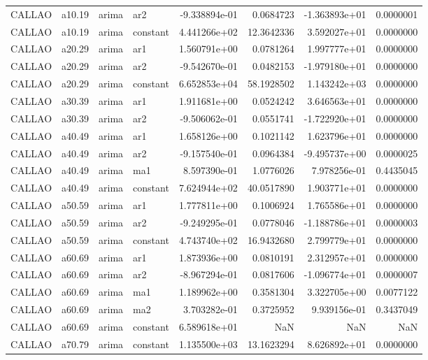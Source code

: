 \documentclass[
]{article}
\begin{document}
\begin{table}[!h]
\begin{tabular}[t]{llllrrrr}
CALLAO & a10.19 & arima & ar2 & -9.338894e-01 & 0.0684723 & -1.363893e+01 & 0.0000001\\
CALLAO & a10.19 & arima & constant & 4.441266e+02 & 12.3642336 & 3.592027e+01 & 0.0000000\\
CALLAO & a20.29 & arima & ar1 & 1.560791e+00 & 0.0781264 & 1.997777e+01 & 0.0000000\\
CALLAO & a20.29 & arima & ar2 & -9.542670e-01 & 0.0482153 & -1.979180e+01 & 0.0000000\\
\addlinespace
CALLAO & a20.29 & arima & constant & 6.652853e+04 & 58.1928502 & 1.143242e+03 & 0.0000000\\
CALLAO & a30.39 & arima & ar1 & 1.911681e+00 & 0.0524242 & 3.646563e+01 & 0.0000000\\
CALLAO & a30.39 & arima & ar2 & -9.506062e-01 & 0.0551741 & -1.722920e+01 & 0.0000000\\
CALLAO & a40.49 & arima & ar1 & 1.658126e+00 & 0.1021142 & 1.623796e+01 & 0.0000000\\
CALLAO & a40.49 & arima & ar2 & -9.157540e-01 & 0.0964384 & -9.495737e+00 & 0.0000025\\
\addlinespace
CALLAO & a40.49 & arima & ma1 & 8.597390e-01 & 1.0776026 & 7.978256e-01 & 0.4435045\\
CALLAO & a40.49 & arima & constant & 7.624944e+02 & 40.0517890 & 1.903771e+01 & 0.0000000\\
CALLAO & a50.59 & arima & ar1 & 1.777811e+00 & 0.1006924 & 1.765586e+01 & 0.0000000\\
CALLAO & a50.59 & arima & ar2 & -9.249295e-01 & 0.0778046 & -1.188786e+01 & 0.0000003\\
CALLAO & a50.59 & arima & constant & 4.743740e+02 & 16.9432680 & 2.799779e+01 & 0.0000000\\
\addlinespace
CALLAO & a60.69 & arima & ar1 & 1.873936e+00 & 0.0810191 & 2.312957e+01 & 0.0000000\\
CALLAO & a60.69 & arima & ar2 & -8.967294e-01 & 0.0817606 & -1.096774e+01 & 0.0000007\\
CALLAO & a60.69 & arima & ma1 & 1.189962e+00 & 0.3581304 & 3.322705e+00 & 0.0077122\\
CALLAO & a60.69 & arima & ma2 & 3.703282e-01 & 0.3725952 & 9.939156e-01 & 0.3437049\\
CALLAO & a60.69 & arima & constant & 6.589618e+01 & NaN & NaN & NaN\\
\addlinespace
CALLAO & a70.79 & arima & constant & 1.135500e+03 & 13.1623294 & 8.626892e+01 & 0.0000000\\

\end{tabular}
\end{table}
\end{document}
